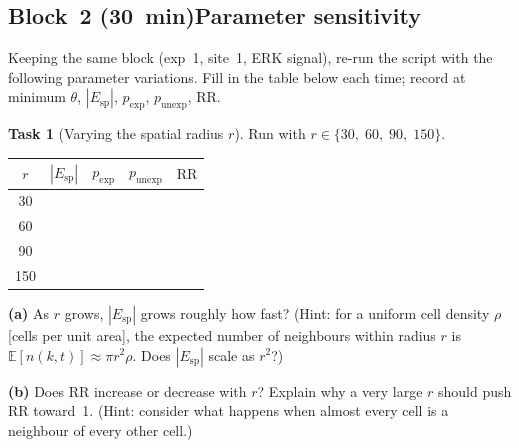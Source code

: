 \documentclass[11pt,a4paper]{article}
\theoremstyle{definition}
\newtheorem{task}{Task}
\newcommand{\RR}{\mathrm{RR}}
\newcommand{\pE}{p_{\mathrm{exp}}}
\newcommand{\pU}{p_{\mathrm{unexp}}}
\newcommand{\1}[1]{\mathbf{1}\!\left[#1\right]}
\newcommand{\Thr}{\theta}
\begin{document}
\subsection*{Block~2 (30~min)\quad Parameter sensitivity}

Keeping the same block (exp~1, site~1, ERK signal), re-run the script with the
following parameter variations.
Fill in the table below each time; record at minimum $\Thr$, $|E_{\mathrm{sp}}|$,
$\pE$, $\pU$, $\RR$.

\begin{task}[Varying the spatial radius $r$]\label{task:radius}
Run with $r \in \{30,\; 60,\; 90,\; 150\}$.

\begin{center}
\renewcommand{\arraystretch}{1.4}
\begin{tabular}{ccccc}
\toprule
$r$ & $|E_{\mathrm{sp}}|$ & $\pE$ & $\pU$ & $\RR$ \\
\midrule
30  & & & & \\
60  & & & & \\
90  & & & & \\
150 & & & & \\
\bottomrule
\end{tabular}
\end{center}

\medskip
\noindent\textbf{(a)} As $r$ grows, $|E_{\mathrm{sp}}|$ grows roughly how fast?
(Hint: for a uniform cell density $\rho$ [cells per unit area], the expected
number of neighbours within radius $r$ is $\mathbb{E}[n(k,t)] \approx \pi r^2 \rho$.
Does $|E_{\mathrm{sp}}|$ scale as $r^2$?)



\noindent\textbf{(b)} Does $\RR$ increase or decrease with $r$?
Explain why a very large $r$ should push $\RR$ toward~1.
(Hint: consider what happens when almost every cell is a neighbour of every
other cell.)


\end{task}
\end{document}
